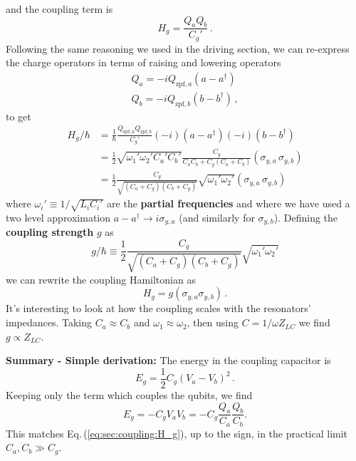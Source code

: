 and the coupling term is
\begin{equation}
  H_g = \frac{ Q_a Q_b} {C_g'} \, . \label{eq:sec:coupling:H_g}
\end{equation}
Following the same reasoning we used in the driving section, we can re-express the charge operators in terms of raising and lowering operators
\begin{align}
  Q_a = -i Q_{\text{zpf}, a} (a - a^{\dagger}) \nonumber \\
  Q_b = -i Q_{\text{zpf}, b} (b - b^{\dagger}) \nonumber \, ,
\end{align}
to get
\begin{align*}
  H_g / \hbar
  &= \frac{1}{\hbar} \frac{Q_{\text{zpf},a}Q_{\text{zpf},b}}{C_g'}
    (-i)(a - a^\dagger) (-i)(b - b^\dagger) \\
  &= \frac{1}{2} \sqrt{\omega_1' \omega_2' C_a' C_b'}
    \frac{C_g}{C_a C_b + C_g(C_a + C_b)} (\sigma_{y,a} \, \sigma_{y,b}) \\
  &= \frac{1}{2}\frac{C_g}{\sqrt{(C_a + C_g) (C_b + C_g)}}
    \sqrt{\omega_1' \omega_2'} (\sigma_{y,a} \, \sigma_{y,b})
\end{align*}
where $\omega_i' \equiv 1 / \sqrt{L_i C_i'}$ are the \textbf{partial frequencies} and where we have used a two level approximation \mbox{$a - a^\dagger \rightarrow i \sigma_{y,a}$} (and similarly for $\sigma_{y, b}$).
Defining the \textbf{coupling strength} $g$ as
\begin{equation}
  g/\hbar \equiv \frac{1}{2} \frac{C_g}{\sqrt{(C_a + C_g) (C_b + C_g)}} \sqrt{\omega_1' \omega_2'}
\end{equation}
we can rewrite the coupling Hamiltonian as
\begin{equation*}
  H_g = g \left( \sigma_{y,a} \sigma_{y,b} \right) \, .
\end{equation*}
It's interesting to look at how the coupling scales with the resonators' impedances.
Taking $C_a \approx C_b$ and $\omega_1 \approx \omega_2$, then using $C = 1 / \omega Z_{LC}$ we find $g \propto Z_{LC}$.

\textbf{Summary - Simple derivation:} The energy in the coupling capacitor is
\begin{equation*}
  E_g = \frac{1}{2} C_g \left( V_a - V_b \right)^2 \, .
\end{equation*}
Keeping only the term which couples the qubits, we find
\begin{equation*}
  E_g = -C_g V_a V_b = -C_g \frac{Q_a}{C_a} \frac{Q_b}{C_b} .
\end{equation*}
This matches Eq.\,(\ref{eq:sec:coupling:H_g}), up to the sign, in the practical limit $C_a,C_b \gg C_g$.

